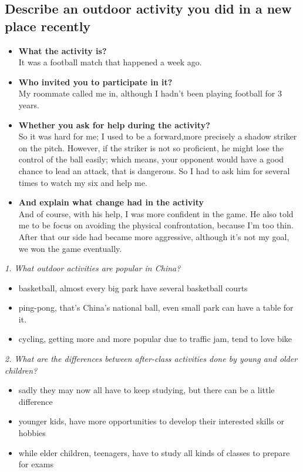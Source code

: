 \documentclass[conference]{IEEEtran}
\begin{document}
\subsection{Describe an outdoor activity you did in a new place recently}
\begin{itemize}
    \item \textbf{What the activity is?}\\
    It was a football match that happened a week ago.
    \item \textbf{Who invited you to participate in it?}\\
    My roommate called me in, although I hadn't been playing football for 3 years. 
    \item \textbf{Whether you ask for help during the activity?}\\
    So it was hard for me;
    I used to be a forward,more precisely a shadow striker on the pitch.
    However, if the striker is not so proficient, he might lose the control of the ball easily;
    which means, your opponent would have a good chance to lead an attack, that is dangerous.
    So I had to ask him for several times to watch my six and help me.
    \item \textbf{And explain what change had in the activity}\\
    And of course, with his help, I was more confident in the game.
    He also told me to be focus on avoiding the physical confrontation, because I'm too thin.
    After that our side had became more aggressive, although it's not my goal, we won the game eventually.
\end{itemize}

\textit{1. What outdoor activities are popular in China?}
\begin{itemize}
    \item basketball, almost every big park have several basketball courts
    \item ping-pong, that's China's national ball, even small park can have a table for it.
    \item cycling, getting more and more popular due to traffic jam, tend to love bike
\end{itemize}

\textit{2. What are the differences between after-class activities done by young and older children?}
\begin{itemize}
    \item sadly they may now all have to keep studying, but there can be a little difference
    \item younger kids, have more opportunities to develop their interested skills or hobbies
    \item while elder children, teenagers, have to study all kinds of classes to prepare for exams
\end{itemize}
\end{document}
